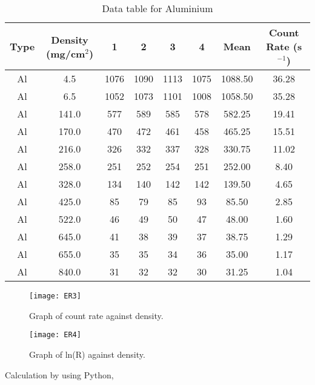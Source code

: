 \documentclass[a4paper,11pt]{article}
\begin{document}
\begin{table}[h!]
\centering
\begin{tabular}{ |c|c|c|c|c|c|c|c| } 
\hline
Type & Density (mg/cm\(^2\)) & 1 & 2 & 3 & 4 & Mean & Count Rate (s$^{-1}$) \\
\hline
Al & 4.5 & 1076 & 1090 & 1113 & 1075 & 1088.50 & 36.28 \\
\hline
Al & 6.5 & 1052 & 1073 & 1101 & 1008 & 1058.50 & 35.28 \\
\hline
Al & 141.0 & 577 & 589 & 585 & 578 & 582.25 & 19.41 \\
\hline
Al & 170.0 & 470 & 472 & 461 & 458 & 465.25 & 15.51 \\
\hline
Al & 216.0 & 326 & 332 & 337 & 328 & 330.75 & 11.02 \\
\hline
Al & 258.0 & 251 & 252 & 254 & 251 & 252.00 & 8.40 \\
\hline
Al & 328.0 & 134 & 140 & 142 & 142 & 139.50 & 4.65 \\
\hline
Al & 425.0 & 85 & 79 & 85 & 93 & 85.50 & 2.85 \\
\hline
Al & 522.0 & 46 & 49 & 50 & 47 & 48.00 & 1.60 \\
\hline
Al & 645.0 & 41 & 38 & 39 & 37 & 38.75 & 1.29 \\
\hline
Al & 655.0 & 35 & 35 & 34 & 36 & 35.00 & 1.17 \\
\hline
Al & 840.0 & 31 & 32 & 32 & 30 & 31.25 & 1.04 \\
\hline
\end{tabular}
\caption{Data table for Aluminium}
\label{table:1}
\end{table}
\begin{figure}[h!]
\centering
    \texttt{[image: ER3]}
    \caption{Graph of  count rate against density.}
    \label{fig:setupC}
\end{figure}
\begin{figure}[h!]
\centering
    \texttt{[image: ER4]}
    \caption{Graph of  ln(R) against density.}
    \label{fig:setupC}
\end{figure}
\clearpage
\newpage
\noindent Calculation by using Python,
\end{document}
